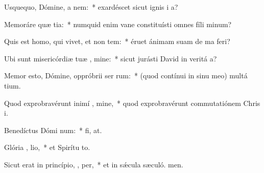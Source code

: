 \item Usquequo, Dómine, a  nem:~* exardéscet sicut ignis i a?
\item Memoráre quæ  tia:~* numquid enim vane constituísti omnes fíli minum?
\item Quis est homo, qui vivet, et non  tem:~* éruet ánimam suam de ma feri?
\item Ubi sunt misericórdiæ tuæ , mine:~* sicut jurásti David in veritá a?
\item Memor esto, Dómine, oppróbrii ser rum:~* (quod contínui in sinu meo) multá tium.
\item Quod exprobravérunt inimí , mine,~* quod exprobravérunt commutatiónem Chris i.
\item Benedíctus Dómi  num:~* fi, at.
\item Glória ,  lio,~* et Spirítu to.
\item Sicut erat in princípio,  ,  per,~* et in sǽcula sæculó. men.
